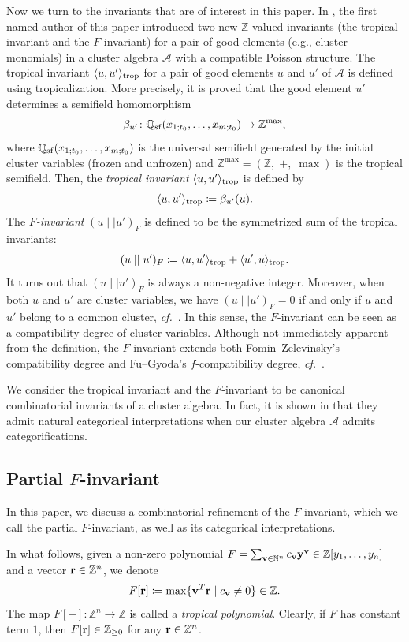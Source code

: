 \documentclass[12pt]{amsart}
\theoremstyle{definition}
\theoremstyle{remark}
\numberwithin{equation}{section}
\newcommand{\confer}{\textit{cf.}\ }
\begin{document}
Now we turn to the invariants that are of interest in this paper. In \cite{Cao-2023}, the first named author of this paper introduced two new $\mathbb Z$-valued invariants (the tropical invariant and the $F$-invariant) for a pair of good elements (e.g., cluster monomials) in a cluster algebra $\mathcal{A}$ with a compatible Poisson structure. 
  The tropical invariant $\langle u,u' \rangle_{\rm trop}$ for a pair of good elements $u$ and $u'$ of $\mathcal{A}$ is defined using tropicalization. More precisely, it is proved that the good element $u'$ determines a semifield homomorphism 
 \[\beta_{u'}\colon\mathbb Q_{\rm sf}(x_{1;t_0},\ldots,x_{m;t_0})\rightarrow \mathbb Z^{\max},\]
where $\mathbb Q_{\rm sf}(x_{1;t_0},\ldots,x_{m;t_0})$ is the universal semifield generated by the initial cluster variables (frozen and unfrozen) and $\mathbb Z^{\max}=(\mathbb Z,\;+,\;\max)$ is the tropical semifield. Then, the {\em tropical invariant} $\langle u,u' \rangle_{\rm trop}$ is defined by 
\[ \langle u,u' \rangle_{\rm trop}\coloneqq \beta_{u'}(u).\]
The {\em $F$-invariant} $(u\mid\mid u')_F$ is defined to be the symmetrized sum of the tropical invariants:
\[ (u\mid\mid u')_F\coloneqq \langle u,u' \rangle_{\rm trop}+\langle u',u \rangle_{\rm trop}.\]
It turns out that $(u\mid\mid u')_F$ is always a non-negative integer. Moreover, when both $u$ and $u'$ are cluster variables, we have $(u \mid\mid u')_F = 0$ if and only if $u$ and $u'$ belong to a common cluster, \confer \cite[Theorem 4.19]{Cao-2023}.
In this sense, the $F$-invariant can be seen as a compatibility degree of cluster variables. Although not immediately apparent from the definition, the $F$-invariant extends both Fomin--Zelevinsky's compatibility degree and Fu--Gyoda's $f$-compatibility degree, \confer \cite{Cao-2023}.

We consider the tropical invariant and the $F$-invariant to be canonical combinatorial invariants of a cluster algebra.
In fact, it is shown in \cite{Cao-2023,CCG-2026} that they admit natural categorical interpretations when our cluster algebra $\mathcal{A}$ admits categorifications. 

\subsection{Partial $F$-invariant}
In this paper, we discuss a combinatorial refinement of the $F$-invariant, which we call the partial $F$-invariant, as well as its categorical interpretations.

In what follows, given a non-zero polynomial $F=\sum_{{\bf v}\in\mathbb N^n}c_{{\bf v}}{\bf y}^{{\bf v}}\in\mathbb Z[y_1,\ldots,y_n]$  and a vector ${\bf r}\in \mathbb Z^n$, we denote 
$$F[{\bf r}]\coloneqq \max\{{\bf v}^T{\bf r}\mid c_{{\bf v}}\neq 0\}\in\mathbb Z.$$
The map $F[-]\colon\mathbb Z^n\rightarrow\mathbb Z$ is called a {\em tropical polynomial}.  Clearly, if $F$ has constant term $1$, then $F[{\bf r}]\in \mathbb Z_{\geq 0}$ for any ${\bf r}\in \mathbb Z^n$.
\end{document}
